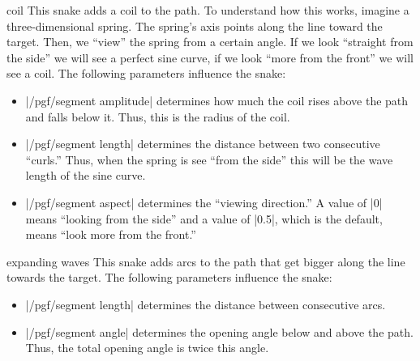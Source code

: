\begin{snake}{coil}
  This snake adds a coil to the path. To understand how this works,
  imagine a three-dimensional spring. The spring's axis points along
  the line toward the target. Then, we ``view'' the spring from a
  certain angle. If we look ``straight from the side'' we will see a
  perfect sine curve, if we look ``more from the front'' we will see a
  coil. The following parameters influence the snake:  
  \begin{itemize}
  \item |/pgf/segment amplitude|
    determines how much the coil rises above the path and falls below
    it. Thus, this is the radius of the coil.
  \item |/pgf/segment length|
    determines the distance between two consecutive ``curls.'' Thus,
    when the spring is see ``from the side'' this will be the wave
    length of the sine curve. 
  \item |/pgf/segment aspect|
    determines the ``viewing direction.'' A value of |0| means
    ``looking from the side'' and a value of |0.5|, which is the
    default, means ``look more from the front.'' 
  \end{itemize}
\begin{codeexample}[]
\end{codeexample}
\end{snake}


\begin{snake}{expanding waves}
  This snake adds arcs to the path that get bigger along the line
  towards the target. The following parameters influence the snake:
  \begin{itemize}
  \item |/pgf/segment length|
    determines the distance between consecutive arcs.
  \item |/pgf/segment angle|
    determines the opening angle below and above the path. Thus, the
    total opening angle is twice this angle.
  \end{itemize}
\begin{codeexample}[]
\end{codeexample}
\end{snake}


